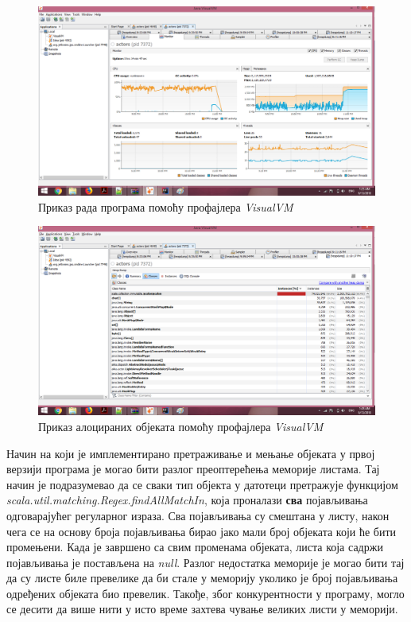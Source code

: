 \documentclass[12pt,oneside]{memoir}
\begin{document}
\begin{figure}[t!]
\centering
\includegraphics[width=1\textwidth]{10_Workera_1000ms.png}
\caption{Приказ рада програма помоћу профајлера \textit{VisualVM}}
\label{fig:monitor}
\end{figure}

\begin{figure}[t!]
\centering
\includegraphics[width=1\textwidth]{10_Workera_1000ms_HD6.png}
\caption{Приказ алоцираних објеката помоћу профајлера \textit{VisualVM}}
\label{fig:HD}
\end{figure}

Начин на који је имплементирано претраживање и мењање објеката у првој верзији програма је могао бити разлог преоптерећења меморије листама. Тај начин је подразумевао да се сваки тип објекта у датотеци претражује функцијом \textit{scala.util.matching.Regex.findAllMatchIn}, која проналази \textbf{сва} појављивања одговарајућег регуларног израза. Сва појављивања су смештана у листу, након чега се на основу броја појављивања бирао јако мали број објеката који ће бити промењени. Када је завршено са свим променама објеката, листа која садржи појављивања је постављена на \textit{null}. Разлог недостатка меморије је могао бити тај да су листе биле превелике да би стале у меморију уколико је број појављивања одређених објеката био превелик. Такође, због конкурентности у програму, могло се десити да више нити у исто време захтева чување великих листи у меморији. 
\end{document}
